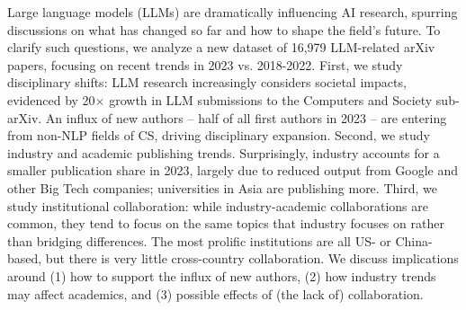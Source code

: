 Large language models (LLMs) are dramatically influencing AI research, spurring discussions on what has changed so far and how to shape the field's future. To clarify such questions, we analyze a new dataset of 16,979 LLM-related arXiv papers, focusing on recent trends in 2023 vs. 2018-2022. First, we study disciplinary shifts: LLM research increasingly considers societal impacts, evidenced by 20$\times$ growth in LLM submissions to the Computers and Society sub-arXiv. An influx of new authors -- half of all first authors in 2023 -- are entering from non-NLP fields of CS, driving disciplinary expansion. Second, we study industry and academic publishing trends. Surprisingly, industry accounts for a smaller publication share in 2023, largely due to reduced output from Google and other Big Tech companies; universities in Asia are publishing more. Third, we study institutional collaboration: while industry-academic collaborations are common, they tend to focus on the same topics that industry focuses on rather than bridging differences. The most prolific institutions are all US- or China-based, but there is very little cross-country collaboration. We discuss implications around (1) how to support the influx of new authors, (2) how industry trends may affect academics, and (3) possible effects of (the lack of) collaboration.